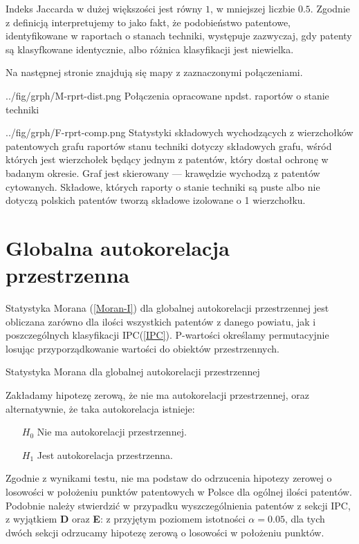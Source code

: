 Indeks Jaccarda
w dużej większości jest równy $1$, w mniejszej liczbie $0.5$.
Zgodnie z definicją  interpretujemy to jako fakt, że
podobieństwo patentowe, identyfikowane w raportach o stanach techniki,
występuje zazwyczaj, gdy patenty są klasyfkowane identycznie, albo
różnica klasyfikacji jest niewielka.

Na następnej stronie znajdują się mapy z zaznaczonymi połączeniami.

\newpage

  \chart
{../fig/grph/M-rprt-dist.png}
{ Połączenia opracowane npdst. raportów o stanie techniki }\newpage

\newpage

  \chartside
{../fig/grph/F-rprt-comp.png}
{ Statystyki składowych wychodzących z wierzchołków patentowych
  grafu raportów stanu techniki }{
 dotyczy składowych grafu, wśród których
jest wierzchołek będący jednym z patentów, który dostał ochronę w badanym okresie.
Graf jest skierowany --- krawędzie wychodzą z patentów cytowanych.
Składowe, których raporty o stanie techniki są puste albo nie dotyczą 
polskich patentów tworzą składowe izolowane o 1 wierzchołku.
}



    \newpage\section
  {Globalna autokorelacja przestrzenna}

Statystyka Morana (\cref{Moran-I}) dla globalnej autokorelacji przestrzennej
jest obliczana zarówno dla ilości wszystkich patentów z danego powiatu, 
jak i poszczególnych klasyfikacji \ac{IPC}(\cref{IPC}).
P-wartości określamy permutacyjnie losując przyporządkowanie wartości
do obiektów przestrzennych\cite{pysal-07}.

{ Statystyka Morana dla globalnej 
  autokorelacji przestrzennej }
{
  Zakładamy hipotezę zerową, że nie ma autokorelacji przestrzennej, oraz
alternatywnie, że taka autokorelacja istnieje:
\begin{itemize}
\item[$H_0$] Nie ma autokorelacji przestrzennej.
\item[$H_1$] Jest autokorelacja przestrzenna.
\end{itemize}}

Zgodnie z wynikami testu, nie ma podstaw do odrzucenia hipotezy zerowej
o losowości w położeniu punktów patentowych w Polsce dla ogólnej ilości patentów.
Podobnie należy stwierdzić w przypadku wyszczególnienia patentów z sekcji \ac{IPC},
z wyjątkiem \textbf{D} oraz \textbf{E}: z przyjętym poziomem istotności $\alpha=0.05$,
dla tych dwóch sekcji odrzucamy hipotezę zerową o losowości w położeniu punktów.

